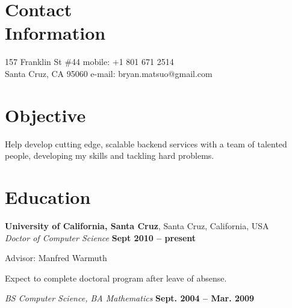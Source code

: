 \documentclass[margin,line]{resume}
\begin{document}
\begin{resume}

    \section{\mysidestyle Contact\\Information}

    157 Franklin St \#44            \hfill mobile: +1 801 671 2514         \vspace{0mm}\\\vspace{0mm}%
    Santa Cruz, CA 95060            \hfill e-mail: bryan.matsuo@gmail.com   \vspace{0mm}\\\vspace{-4.5mm}%


    \section{\mysidestyle Objective}

    Help develop cutting edge, scalable backend services with a team of talented people, developing my skills and
    tackling hard problems.


    \section{\mysidestyle Education}

    \textbf{University of California, Santa Cruz}, Santa Cruz, California, USA \vspace{2mm}\\\vspace{1mm}%
    \textsl{Doctor of Computer Science} \hfill \textbf{ Sept 2010 -- present}\vspace{-3mm}\\\vspace{-1mm}%
    \begin{mylist}
        \item Advisor:  Manfred Warmuth
        \item Expect to complete doctoral program after leave of absense.
    \end{mylist}\vspace{-1.5mm}
    \textsl{BS Computer Science, BA Mathematics} \hfill \textbf{Sept. 2004 -- Mar. 2009}\vspace{-3mm}\\\vspace{-1mm}%



\end{resume}
\end{document}
